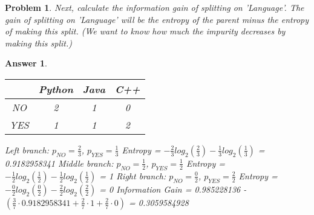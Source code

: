 \documentclass[11pt]{article}
\theoremstyle{description}
\newtheorem{problem}{Problem}
\theoremstyle{break}
\newtheorem*{answer}{Answer}
\begin{document}
    \begin{problem}
        Next, calculate the information gain of splitting on 'Language'.
        The gain of splitting on 'Language' will be the entropy of the parent minus the entropy of
        making this split.
        (We want to know how much the impurity decreases by making this split.)
    \end{problem}
    \begin{answer}
        \begin{tabular}{c|c|c|c}
            & Python & Java & C++ \\
            \hline
            NO  & 2      & 1    & 0   \\
            YES & 1      & 1    & 2   \\
        \end{tabular}\newline
        Left branch: $p_{NO} = \frac{2}{3}$, $p_{YES} = \frac{1}{3}$\newline
        Entropy = $-\frac{2}{3}log_{2}(\frac{2}{3}) - \frac{1}{3}log_{2}(\frac{1}{3})$\newline
        = 0.9182958341\newline
        Middle branch: $p_{NO} = \frac{1}{2}$, $p_{YES} = \frac{1}{2}$\newline
        Entropy = $-\frac{1}{2}log_{2}(\frac{1}{2}) - \frac{1}{2}log_{2}(\frac{1}{2})$\newline
        = 1\newline
        Right branch: $p_{NO} = \frac{0}{2}$, $p_{YES} = \frac{2}{2}$\newline
        Entropy = $-\frac{0}{2}log_{2}(\frac{0}{2}) - \frac{2}{2}log_{2}(\frac{2}{2})$\newline
        = 0\newline
        Information Gain = 0.985228136 -
        $(\frac{3}{7}\cdot 0.9182958341 + \frac{2}{7}\cdot 1 + \frac{2}{7}\cdot 0)$\newline
        = 0.3059584928\newline
    \end{answer}
\end{document}
